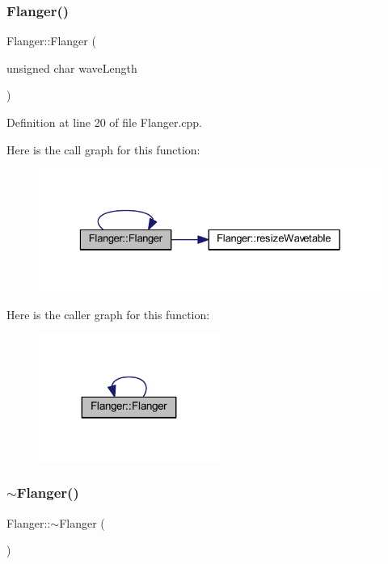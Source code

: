 \subsubsection{\texorpdfstring{Flanger()}{Flanger()}}
{\footnotesize\ttfamily Flanger\+::\+Flanger (\begin{DoxyParamCaption}\item[{unsigned char}]{wave\+Length }\end{DoxyParamCaption})}



Definition at line 20 of file Flanger.\+cpp.

Here is the call graph for this function\+:
\nopagebreak
\begin{figure}[H]
\begin{center}
\leavevmode
\includegraphics[width=329pt]{class_flanger_a973e269aa2e2bab6c56e9d4c92b85baf_cgraph}
\end{center}
\end{figure}
Here is the caller graph for this function\+:
\nopagebreak
\begin{figure}[H]
\begin{center}
\leavevmode
\includegraphics[width=167pt]{class_flanger_a973e269aa2e2bab6c56e9d4c92b85baf_icgraph}
\end{center}
\end{figure}
\mbox{\label{class_flanger_ab37e3e9863d1f762ed25147dd8db2dec}} 
\subsubsection{\texorpdfstring{$\sim$\+Flanger()}{~Flanger()}}
{\footnotesize\ttfamily Flanger\+::$\sim$\+Flanger (\begin{DoxyParamCaption}{ }\end{DoxyParamCaption})}



